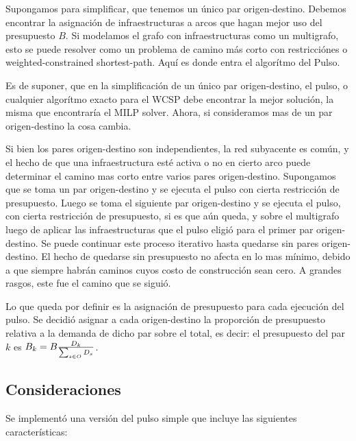\documentclass{article}
\begin{document}
  Supongamos para simplificar, que tenemos un único par origen-destino. Debemos encontrar la asignación de infraestructuras a arcos que hagan mejor uso del presupuesto $B$. Si modelamos el grafo con infraestructuras como un multigrafo, esto se puede resolver como un problema de camino más corto con restricciónes o weighted-constrained shortest-path. Aquí es donde entra el algorítmo del Pulso.

  Es de suponer, que en la simplificación de un único par origen-destino, el pulso, o cualquier algorítmo exacto para el WCSP debe encontrar la mejor solución, la misma que encontraría el MILP solver. Ahora, si consideramos mas de un par origen-destino la cosa cambia.

  Si bien los pares origen-destino son independientes, la red subyacente es común, y el hecho de que una infraestructura esté activa o no en cierto arco puede determinar el camino mas corto entre varios pares origen-destino. Supongamos que se toma un par origen-destino y se ejecuta el pulso con cierta restricción de presupuesto. Luego se toma el siguiente par origen-destino y se ejecuta el pulso, con cierta restricción de presupuesto, si es que aún queda, y sobre el multigrafo luego de aplicar las infraestructuras que el pulso eligió para el primer par origen-destino. Se puede continuar este proceso iterativo hasta quedarse sin pares origen-destino. El hecho de quedarse sin presupuesto no afecta en lo mas mínimo, debido a que siempre habrán caminos cuyos costo de construcción sean cero. A grandes rasgos, este fue el camino que se siguió.

  Lo que queda por definir es la asignación de presupuesto para cada ejecución del pulso. Se decidió asignar a cada origen-destino la proporción de presupuesto relativa a la demanda de dicho par sobre el total, es decir: el presupuesto del par $k$ es $B_k = B  {D_k \over \sum_{s \in O} D_s}$.

  \subsection*{Consideraciones}

  Se implementó una versión del pulso simple que incluye las siguientes características:
\end{document}
